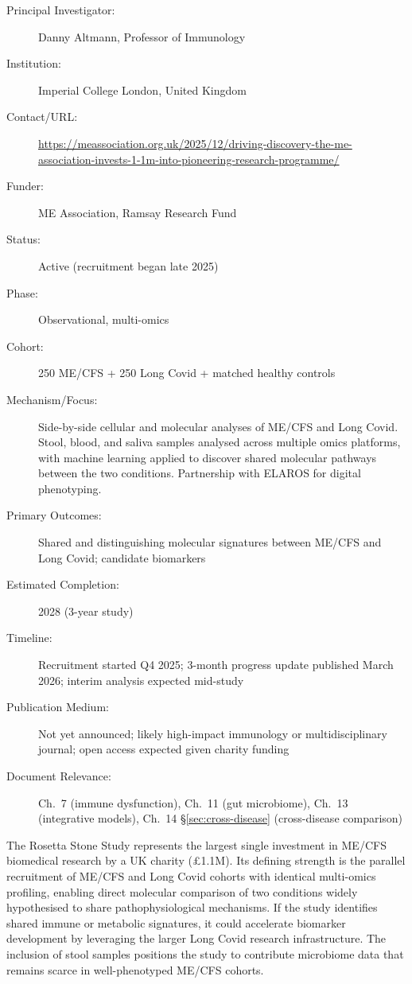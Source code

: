 \begin{description}
    \item[Principal Investigator:] Danny Altmann, Professor of Immunology
    \item[Institution:] Imperial College London, United Kingdom
    \item[Contact/URL:] \url{https://meassociation.org.uk/2025/12/driving-discovery-the-me-association-invests-1-1m-into-pioneering-research-programme/}
    \item[Funder:] ME Association, Ramsay Research Fund
    \item[Status:] Active (recruitment began late 2025)
    \item[Phase:] Observational, multi-omics
    \item[Cohort:] 250 ME/CFS + 250 Long Covid + matched healthy controls
    \item[Mechanism/Focus:] Side-by-side cellular and molecular analyses of
        ME/CFS and Long Covid.  Stool, blood, and saliva samples analysed
        across multiple omics platforms, with machine learning applied to
        discover shared molecular pathways between the two conditions.
        Partnership with ELAROS for digital phenotyping.
    \item[Primary Outcomes:] Shared and distinguishing molecular signatures
        between ME/CFS and Long Covid; candidate biomarkers
    \item[Estimated Completion:] 2028 (3-year study)
    \item[Timeline:] Recruitment started Q4 2025; 3-month progress update
        published March 2026; interim analysis expected mid-study
    \item[Publication Medium:] Not yet announced; likely high-impact
        immunology or multidisciplinary journal; open access expected given
        charity funding
    \item[Document Relevance:] Ch.~7 (immune dysfunction), Ch.~11 (gut
        microbiome), Ch.~13 (integrative models), Ch.~14 \S\ref{sec:cross-disease}
        (cross-disease comparison)
\end{description}

The Rosetta Stone Study represents the largest single investment in ME/CFS
biomedical research by a UK charity (\pounds1.1M).  Its defining strength is
the parallel recruitment of ME/CFS and Long Covid cohorts with identical
multi-omics profiling, enabling direct molecular comparison of two conditions
widely hypothesised to share pathophysiological mechanisms.  If the study
identifies shared immune or metabolic signatures, it could accelerate
biomarker development by leveraging the larger Long Covid research
infrastructure.  The inclusion of stool samples positions the study to
contribute microbiome data that remains scarce in well-phenotyped ME/CFS
cohorts.

